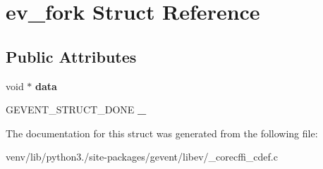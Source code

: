 \hypertarget{structev__fork}{}\section{ev\+\_\+fork Struct Reference}
\label{structev__fork}
\subsection*{Public Attributes}
\begin{DoxyCompactItemize}
\item 
\mbox{\label{structev__fork_a30f5b019607b7e50c4dd06a0ec7b7449}} 
void $\ast$ {\bfseries data}
\item 
\mbox{\label{structev__fork_a01c961ea23c63610fed8012501ac6335}} 
G\+E\+V\+E\+N\+T\+\_\+\+S\+T\+R\+U\+C\+T\+\_\+\+D\+O\+NE {\bfseries \+\_\+}
\end{DoxyCompactItemize}


The documentation for this struct was generated from the following file\+:\begin{DoxyCompactItemize}
\item 
venv/lib/python3./site-\/packages/gevent/libev/\+\_\+corecffi\+\_\+cdef.\+c\end{DoxyCompactItemize}
